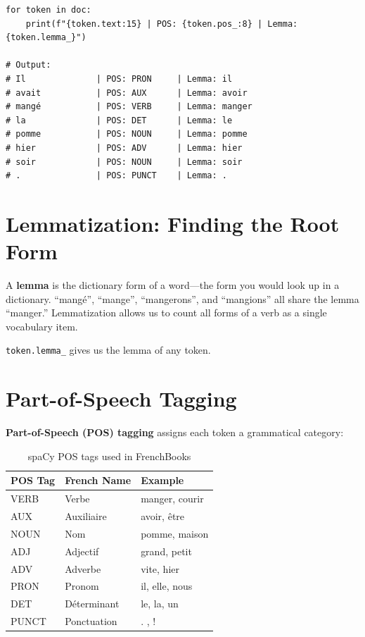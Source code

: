 \documentclass[12pt,oneside]{book}
\begin{document}
\begin{lstlisting}[caption={Inspecting spaCy tokens}]
for token in doc:
    print(f"{token.text:15} | POS: {token.pos_:8} | Lemma: {token.lemma_}")

# Output:
# Il              | POS: PRON     | Lemma: il
# avait           | POS: AUX      | Lemma: avoir
# mangé           | POS: VERB     | Lemma: manger
# la              | POS: DET      | Lemma: le
# pomme           | POS: NOUN     | Lemma: pomme
# hier            | POS: ADV      | Lemma: hier
# soir            | POS: NOUN     | Lemma: soir
# .               | POS: PUNCT    | Lemma: .
\end{lstlisting}

\section{Lemmatization: Finding the Root Form}

A \textbf{lemma} is the dictionary form of a word—the form you would look up in a
dictionary. ``mangé'', ``mange'', ``mangerons'', and ``mangions'' all share the lemma
``manger.'' Lemmatization allows us to count all forms of a verb as a single vocabulary
item.

\texttt{token.lemma\_} gives us the lemma of any token.

\section{Part-of-Speech Tagging}

\textbf{Part-of-Speech (POS) tagging} assigns each token a grammatical category:

\begin{table}[H]
\centering
\caption{spaCy POS tags used in FrenchBooks}
\begin{tabularx}{\textwidth}{l l X}
\toprule
\textbf{POS Tag} & \textbf{French Name} & \textbf{Example} \\
\midrule
VERB & Verbe & manger, courir \\
AUX  & Auxiliaire & avoir, être \\
NOUN & Nom & pomme, maison \\
ADJ  & Adjectif & grand, petit \\
ADV  & Adverbe & vite, hier \\
PRON & Pronom & il, elle, nous \\
DET  & Déterminant & le, la, un \\
PUNCT & Ponctuation & . , ! \\
\bottomrule
\end{tabularx}
\end{table}
\end{document}
